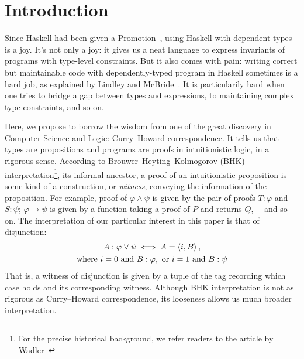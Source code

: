 \documentclass[demotion-paper.tex]{subfiles}
\begin{document}
\section{Introduction}
Since Haskell had been given a Promotion~\cite{Yorgey:2012}, using Haskell with dependent types is a joy.
It's not only a joy: it gives us a neat language to express invariants of programs with type-level constraints.
But it also comes with pain: writing correct but maintainable code with dependently-typed program in Haskell sometimes is a hard job, as explained by Lindley and McBride~\cite{10.1145/2503778.2503786}.
It is particularily hard when one tries to bridge a gap between types and expressions, to maintaining complex type constraints, and so on.

Here, we propose to borrow the wisdom from one of the great discovery in Computer Science and Logic: Curry--Howard correspondence.
It tells us that types are propositions and programs are proofs in intuitionistic logic, in a rigorous sense.
According to Brouwer--Heyting--Kolmogorov (BHK) interpretation\footnote{For the precise historical background, we refer readers to the article by Wadler~\cite{Wadler:2015aa}}, its informal ancestor, a proof of an intuitionistic proposition is some kind of a construction, or \emph{witness}, conveying the information of the proposition.
For example, proof of $\varphi \land \psi$ is given by the pair of proofs $T: \varphi$ and $S: \psi$; $\varphi \to \psi$ is given by a function taking a proof of $P$ and returns $Q$, ---and so on.
The interpretation of our particular interest in this paper is that of disjunction:
\begin{gather*}
  A: \varphi \vee \psi \iff A = \braket{i, B},
\\
\text{where }
i = 0 \text{ and } B: \varphi, \text{ or }
i = 1 \text{ and } B: \psi
\end{gather*}
That is, a witness of disjunction is given by a tuple of the tag recording which case holds and its corresponding witness.
Although BHK interpretation is not as rigorous as Curry--Howard correspondence, its looseness allows us much broader interpretation.
\end{document}
